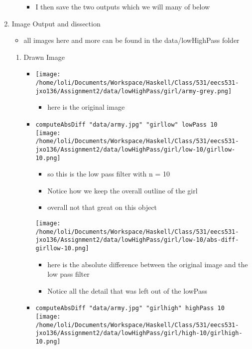 \documentclass{article}
\begin{document}
\begin{enumerate}
\begin{itemize}
\begin{itemize}
\item I then save the two outputs which we will many of below
\end{itemize}
\end{itemize}
\item Image Output and dissection
\label{sec-1-3}
\begin{itemize}
\item all images here and more can be found in the data/lowHighPass folder
\end{itemize}
\begin{enumerate}
\item Drawn Image
\label{sec-1-3-1}
\begin{itemize}
\item \texttt{[image: /home/loli/Documents/Workspace/Haskell/Class/531/eecs531-jxo136/Assignment2/data/lowHighPass/girl/army-grey.png]}
\begin{itemize}
\item here is the original image
\end{itemize}
\item \texttt{computeAbsDiff "data/army.jpg" "girllow" lowPass 10}
\\
\texttt{[image: /home/loli/Documents/Workspace/Haskell/Class/531/eecs531-jxo136/Assignment2/data/lowHighPass/girl/low-10/girllow-10.png]}
\begin{itemize}
\item so this is the low pass filter with n = 10
\item Notice how we keep the overall outline of the girl
\item overall not that great on this object
\end{itemize}
\texttt{[image: /home/loli/Documents/Workspace/Haskell/Class/531/eecs531-jxo136/Assignment2/data/lowHighPass/girl/low-10/abs-diff-girllow-10.png]}
\begin{itemize}
\item here is the absolute difference between the original image and the
low pass filter
\item Notice all the detail that was left out of the lowPass
\end{itemize}
\item \texttt{computeAbsDiff "data/army.jpg" "girlhigh" highPass 10} \\
  \texttt{[image: /home/loli/Documents/Workspace/Haskell/Class/531/eecs531-jxo136/Assignment2/data/lowHighPass/girl/high-10/girlhigh-10.png]}

\end{itemize}
\end{enumerate}
\end{enumerate}
\end{document}

